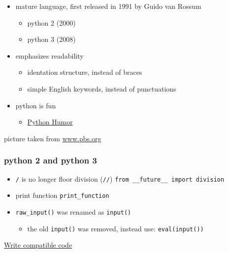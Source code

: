\documentclass{article}
\begin{document}
\begin{itemize}
\item
  mature language, first released in 1991 by Guido van Rossum

  \begin{itemize}
  \item
    python 2 (2000)
  \item
    python 3 (2008)
  \end{itemize}
\item
  emphasizes readability

  \begin{itemize}
  \item
    identation structure, instead of braces
  \item
    simple English keywords, instead of punctuations
  \end{itemize}
\item
  python is fun

  \begin{itemize}
  \itemsep1pt\parskip0pt
  \item
    \href{https://www.python.org/doc/humor/}{Python Humor}
  \end{itemize}
\end{itemize}

    picture taken from
\href{http://www.pbs.org/montypython/bios.html}{www.pbs.org}

    \subsubsection{python 2 and python 3}\label{python-2-and-python-3}

\begin{itemize}
\item
  \texttt{/} is no longer floor division (\texttt{//})
  \texttt{from \_\_future\_\_ import division}
\item
  print function \texttt{print\_function}
\item
  \texttt{raw\_input()} was renamed as \texttt{input()}

  \begin{itemize}
  \itemsep1pt\parskip0pt
  \item
    the old \texttt{input()} was removed, instead use:
    \texttt{eval(input())}
  \end{itemize}
\end{itemize}

\href{http://python-future.org/compatible_idioms.html}{Write compatible
code}
\end{document}
